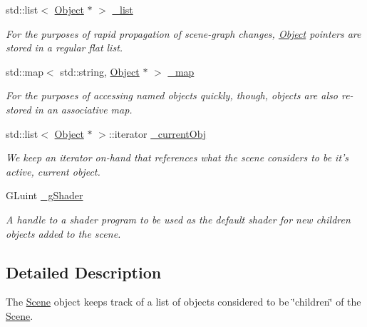 \begin{DoxyCompactItemize}
\item 
\hypertarget{class_scene_acdd0123ca6b2d64d8d447bb485b235fc}{std\-::list$<$ \hyperlink{class_object}{Object} $\ast$ $>$ \hyperlink{class_scene_acdd0123ca6b2d64d8d447bb485b235fc}{\-\_\-list}}\label{class_scene_acdd0123ca6b2d64d8d447bb485b235fc}

\begin{DoxyCompactList}\small\item\em For the purposes of rapid propagation of scene-\/graph changes, \hyperlink{class_object}{Object} pointers are stored in a regular flat list. \end{DoxyCompactList}\item 
std\-::map$<$ std\-::string, \hyperlink{class_object}{Object} $\ast$ $>$ \hyperlink{class_scene_a8bd5d86484a12255b26b92b6cbf8d29a}{\-\_\-map}
\begin{DoxyCompactList}\small\item\em For the purposes of accessing named objects quickly, though, objects are also re-\/stored in an associative map. \end{DoxyCompactList}\item 
\hypertarget{class_scene_ae87ca5350fcc595f3f15a4fd3c39f3d9}{std\-::list$<$ \hyperlink{class_object}{Object} $\ast$ $>$\-::iterator \hyperlink{class_scene_ae87ca5350fcc595f3f15a4fd3c39f3d9}{\-\_\-current\-Obj}}\label{class_scene_ae87ca5350fcc595f3f15a4fd3c39f3d9}

\begin{DoxyCompactList}\small\item\em We keep an iterator on-\/hand that references what the scene considers to be it's active, current object. \end{DoxyCompactList}\item 
\hypertarget{class_scene_a8f9bdd8ec5edb1f414fbd314a36e2724}{G\-Luint \hyperlink{class_scene_a8f9bdd8ec5edb1f414fbd314a36e2724}{\-\_\-g\-Shader}}\label{class_scene_a8f9bdd8ec5edb1f414fbd314a36e2724}

\begin{DoxyCompactList}\small\item\em A handle to a shader program to be used as the default shader for new children objects added to the scene. \end{DoxyCompactList}\end{DoxyCompactItemize}


\subsection{Detailed Description}
The \hyperlink{class_scene}{Scene} object keeps track of a list of objects considered to be \char`\"{}children\char`\"{} of the \hyperlink{class_scene}{Scene}. 

